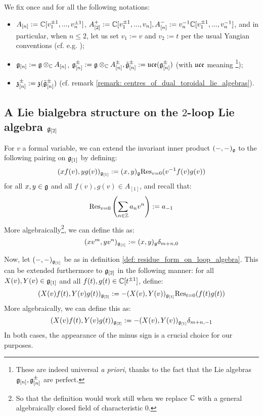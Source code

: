     \begin{convention} \label{conv: multiloop_algebras}
        We fix once and for all the following notations:
        \begin{itemize}
            \item $A_{[n]} := \mathbb{C}[v_1^{\pm 1}, ..., v_n^{\pm 1}]$, $A_{[2]}^+ := \mathbb{C}[v_1^{\pm 1}, ..., v_n], A_{[n]}^- := v_n^{-1}\mathbb{C}[v_1^{\pm 1}, ..., v_n^{-1}]$, and in particular, when $n \leq 2$, let us set $v_1 := v$ and $v_2 := t$ per the usual Yangian conventions (cf. e.g. \cite{wendlandt_formal_shift_operators_on_yangian_doubles});
            \item $\g_{[n]} := \g \tensor_{\bbC} A_{[n]}$, $\g_{[n]}^{\pm} := \g \tensor_{\bbC} A_{[n]}^{\pm}, \tilde{\g}_{[n]}^{\pm} := \uce(\g_{[n]}^{\pm})$ (with $\mathfrak{uce}$ meaning \footnote{These are indeed universal \textit{a priori}, thanks to the fact that the Lie algebras $\mathfrak{g}_{[n]}, \mathfrak{g}_{[n]}^{\pm}$ are perfect.});
            \item $\mathfrak{z}_{[n]}^{\pm} := \mathfrak{z}(\tilde{\mathfrak{g}}_{[n]}^{\pm})$ (cf. remark \ref{remark: centres_of_dual_toroidal_lie_algebras}).
        \end{itemize}
    \end{convention}

    \subsection{A Lie bialgebra structure on the \texorpdfstring{$2$}{}-loop Lie algebra \texorpdfstring{$\mathfrak{g}_{[2]}$}{}}
        \begin{definition} \label{def: residue_form_on_loop_algebra}
            For $v$ a formal variable, we can extend the invariant inner product $(-, -)_{\mathfrak{g}}$ to the following pairing on $\mathfrak{g}_{[1]}$ by defining:
                $$(x f(v), y g(v))_{\mathfrak{g}_{[1]}} := (x, y)_{\mathfrak{g}} \mathrm{Res}_{v = 0}( v^{-1} f(v) g(v) )$$
            for all $x, y \in \mathfrak{g}$ and all $f(v), g(v) \in A_{[1]}$, and recall that:
                $$\mathrm{Res}_{v = 0}\left( \sum_{n \in \mathbb{Z}} a_n v^n \right) := a_{-1}$$
            More algebraically\footnote{So that the definition would work still when we replace $\mathbb{C}$ with a general algebraically closed field of characteristic $0$.}, we can define this as:
                $$(x v^m, y v^n)_{\mathfrak{g}_{[1]}} := (x, y)_{\mathfrak{g}} \delta_{m + n, 0}$$
        \end{definition}
        \begin{definition} \label{def: residue_form_on_multiloop_algebra}
            Now, let $(-, -)_{\mathfrak{g}_{[1]}}$ be as in definition \ref{def: residue_form_on_loop_algebra}. This can be extended furthermore to $\mathfrak{g}_{[2]}$ in the following manner: for all $X(v), Y(v) \in \mathfrak{g}_{[1]}$ and all $f(t), g(t) \in \mathbb{C}[t^{\pm 1}]$, define:
                $$(X(v) f(t), Y(v) g(t))_{\mathfrak{g}_{[2]}} := -(X(v), Y(v))_{\mathfrak{g}_{[1]}} \mathrm{Res}_{t = 0}( f(t) g(t) )$$
            More algebraically, we can define this as:
                $$(X(v) f(t), Y(v) g(t))_{\mathfrak{g}_{[2]}} := -(X(v), Y(v))_{\mathfrak{g}_{[1]}} \delta_{m + n, -1}$$
            In both cases, the appearance of the minus sign is a crucial choice for our purposes. 
        \end{definition}

